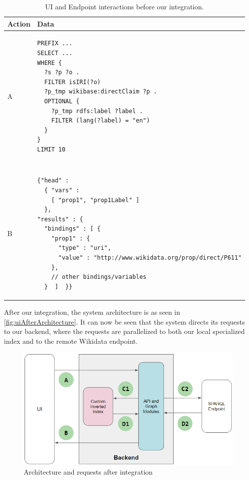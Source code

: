 \begin{table}[h]
\centering
\begin{tabular}{ll}
Action & Data \\ 
\hline
A              
& \begin{minipage}[t]{0.85\linewidth}
\begin{verbatim}
PREFIX ...
SELECT ... 
WHERE {
  ?s ?p ?o .
  FILTER isIRI(?o)
  ?p_tmp wikibase:directClaim ?p .
  OPTIONAL {
    ?p_tmp rdfs:label ?label .
    FILTER (lang(?label) = "en")
  } 
} 
LIMIT 10
\end{verbatim}
\end{minipage}
\\ \\ \\
B             
& \begin{minipage}[t]{0.85\linewidth}
\begin{verbatim}
{"head" : 
  { "vars" : 
    [ "prop1", "prop1Label" ] 
  },
"results" : {
  "bindings" : [ {
    "prop1" : {
      "type" : "uri",
      "value" : "http://www.wikidata.org/prop/direct/P611"
    }, 
    // other bindings/variables
  }  ]  }}
\end{verbatim}
\end{minipage}
\\
\end{tabular}
\caption{UI and Endpoint interactions before our integration.}
\label{table:uiBeforeRequest}
\end{table}

After our integration, the system architecture is as seen in \autoref{fig:uiAfterArchitecture}. It can now be seen that the system directs its requests to our backend, where the requests are parallelized to both our local specialized index and to the remote Wikidata endpoint.

\begin{figure}[h]
    \centering
        \includegraphics[width=\linewidth]{imagenes/uiAfterRequest.png}
        \caption{Architecture and requests after integration}
        \label{fig:uiAfterArchitecture}
\end{figure}

